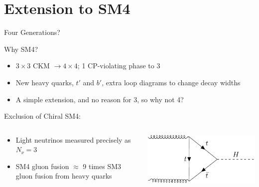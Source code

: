 \documentclass[10pt,xcolor={table,dvipsnames},t]{beamer}
\begin{document}
\section{Extension to SM4}
\begin{frame}{Four Generations?}
    \begin{block}{Why SM4?}
        \begin{itemize}
            \item $3\times3$ CKM $\to4\times4$; 1 CP-violating phase to 3
            \item New heavy quarks, $t'$ and $b'$, extra loop diagrams to change decay widths
            \item A simple extension, and no reason for 3, so why not 4?
        \end{itemize}
    \end{block}
    \begin{block}{Exclusion of Chiral SM4:}
        \begin{columns}[c]
            \begin{column}{0.55\textwidth}
                \begin{itemize}
                    \item Light neutrinos measured precisely as $N_\nu=3$
                    \item SM4 gluon fusion $\approx$ 9 times SM3 gluon fusion from heavy quarks
                \end{itemize}
            \end{column}
            \begin{column}{0.35\textwidth}
                \includegraphics[scale=0.8]{../notes/higgs.pdf}
            \end{column}
        \end{columns}
    \end{block}
\end{frame}
\end{document}
